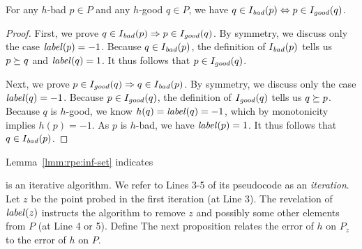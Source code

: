 \begin{lemma} \label{lmm:rpe:inf-set}
    {For any $h$-bad $p \in P$ and any $h$-good $q \in P$, we have $ q \in I_\mathit{bad}(p) \Leftrightarrow p \in I_\mathit{good}(q)$.}
\end{lemma}

\begin{proof}
    {First, we prove $q \in I_\mathit{bad}(p) \Rightarrow p \in I_\mathit{good}(q)$. By symmetry, we discuss only the case $\mathit{label}(p) = -1$. Because $q \in I_\mathit{bad}(p)$, the definition of $I_\mathit{bad}(p)$ tells us $p \succeq q$ and $\mathit{label}(q) = 1$. It thus follows that $p \in I_\mathit{good}(q)$.}

    \vgap

    {Next, we prove $p \in I_\mathit{good}(q) \Rightarrow q \in I_\mathit{bad}(p)$. By symmetry, we discuss only the case $\mathit{label}(q) = -1$. Because $p \in I_\mathit{good}(q)$, the definition of $I_\mathit{good}(q)$ tells us $q \succeq p$. Because $q$ is $h$-good, we know $h(q) = \mathit{label}(q) = -1$, which by monotonicity implies $h(p) = -1$. As $p$ is $h$-bad, we have $\mathit{label}(p) = 1$. It thus follows that $q \in I_\mathit{bad}(p)$.}
\end{proof}

Lemma~\ref{lmm:rpe:inf-set} indicates


     is an iterative algorithm. We refer to Lines 3-5 {of its pseudocode} as an {\em iteration}. Let $z$ be the point probed in the first iteration (at Line 3). The revelation of $\mathit{label}(z)$ instructs the algorithm to remove $z$ and possibly some other elements from $P$ (at Line 4 or 5). Define
    The next proposition relates the error of $h$ on $P_z$ to the error of $h$ on $P$.
    \begin{proposition} \label{prop:rpe:err-Pz}
    \end{proposition}

